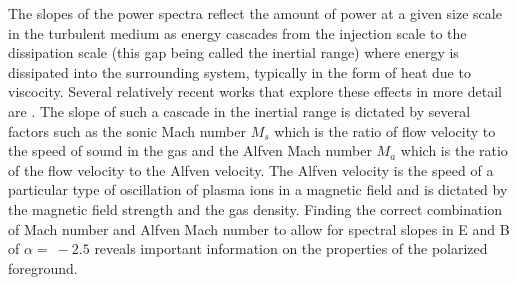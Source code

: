 The slopes of the power spectra reflect the amount of power at a given size
scale in the turbulent medium as energy cascades from the injection scale to the
dissipation scale (this gap being called the inertial range) where energy is
dissipated into the surrounding system, typically in the form of heat due to
viscocity. Several relatively recent works that explore these effects in more
detail are \citep{Clark14,Ghosh17,Cho02}. The slope of such a cascade in
the inertial range is dictated by several factors such as the sonic Mach number
$M_{s}$ which is the ratio of flow velocity to the speed of sound in the gas and
the Alfven Mach number $M_{a}$ which is the ratio of the flow velocity to the
Alfven velocity. The Alfven velocity is the speed of a particular type of
oscillation of plasma ions in a magnetic field and is dictated by the magnetic
field strength and the gas density. Finding the correct combination of Mach
number and Alfven Mach number to allow for spectral slopes in E and B of
$\alpha=~-2.5$ \citep{Planck18XI} reveals important information on the properties of the polarized foreground.
